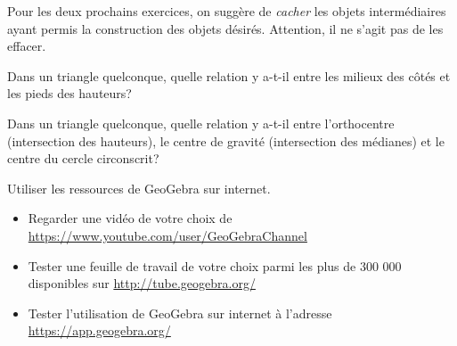 Pour les deux prochains exercices, on suggère de \emph{cacher} les objets
intermédiaires ayant permis la construction des objets désirés. Attention, il ne
s'agit pas de les effacer.

\begin{exercice}%
Dans un triangle quelconque, quelle relation y a-t-il entre les milieux des
côtés et les pieds des hauteurs?
\end{exercice}

\begin{exercice}%
Dans un triangle quelconque, quelle relation y a-t-il entre l'orthocentre
(intersection des hauteurs), le centre de gravité (intersection des médianes) et
le centre du cercle circonscrit?
\end{exercice}

\begin{exercice}
Utiliser les ressources de GeoGebra sur internet.
\begin{itemize}
\item Regarder une vidéo de votre choix de
\url{https://www.youtube.com/user/GeoGebraChannel}
\item Tester une feuille de travail de votre choix parmi les plus de 300 000
disponibles sur \url{http://tube.geogebra.org/}
\item Tester l'utilisation de GeoGebra sur internet à l'adresse
\url{https://app.geogebra.org/}
\end{itemize}
\end{exercice}

